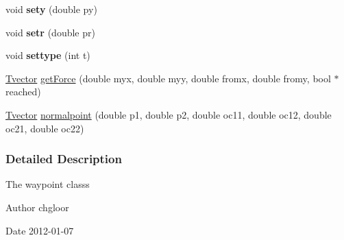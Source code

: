 \begin{DoxyCompactItemize}
\item 
\hypertarget{classTwaypoint_a9c49f8f1da158fbf17b656c1b8385263}{
void {\bfseries sety} (double py)}
\label{classTwaypoint_a9c49f8f1da158fbf17b656c1b8385263}

\item 
\hypertarget{classTwaypoint_ad5eecfd9913b2030319ee470a2898884}{
void {\bfseries setr} (double pr)}
\label{classTwaypoint_ad5eecfd9913b2030319ee470a2898884}

\item 
\hypertarget{classTwaypoint_acea63294ff4af835b91681730b288fc3}{
void {\bfseries settype} (int t)}
\label{classTwaypoint_acea63294ff4af835b91681730b288fc3}

\item 
\hyperlink{classTvector}{Tvector} \hyperlink{classTwaypoint_a1b3cac0878a201645f45c10d870d9172}{getForce} (double myx, double myy, double fromx, double fromy, bool $\ast$reached)
\item 
\hyperlink{classTvector}{Tvector} \hyperlink{classTwaypoint_ac88c7cfc458d15797fac5707964e3c96}{normalpoint} (double p1, double p2, double oc11, double oc12, double oc21, double oc22)
\end{DoxyCompactItemize}


\subsubsection{Detailed Description}
The waypoint classs \begin{DoxyAuthor}{Author}
chgloor 
\end{DoxyAuthor}
\begin{DoxyDate}{Date}
2012-\/01-\/07 
\end{DoxyDate}


